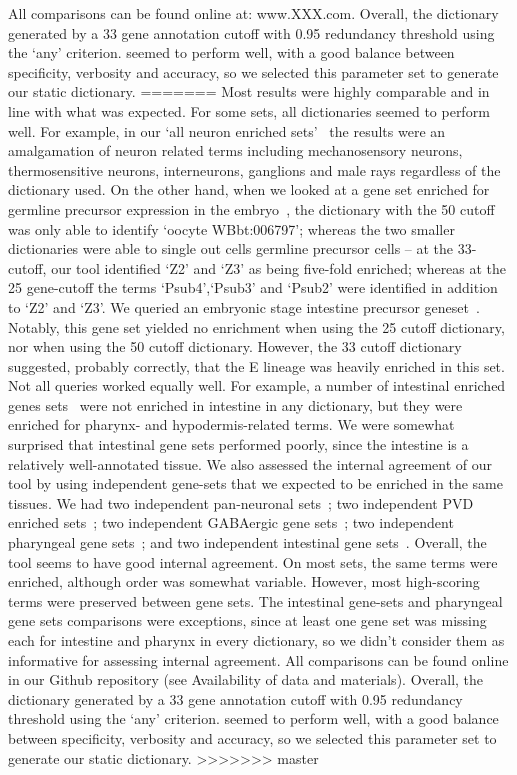 \documentclass[linenumbers, doublespacing]{bmcart}
\begin{document}
	
	 All comparisons can be found online at: www.XXX.com. Overall, the dictionary generated by a 33 gene annotation cutoff with 0.95 redundancy threshold using the `any' criterion. seemed to perform well, with a good balance between specificity, verbosity and accuracy, so we selected this parameter set to generate our static dictionary. 
=======
	Most results were highly comparable and in line with what was expected. For some sets, all dictionaries seemed to perform well. For example, in our `all neuron enriched sets'~\cite{Spencer2011, Watson2008a} the results were an amalgamation of neuron related terms including mechanosensory neurons, thermosensitive neurons, interneurons, ganglions and male rays regardless of the dictionary used. On the other hand, when we looked at a gene set enriched for germline precursor expression in the embryo~\cite{Spencer2011}, the dictionary with the 50 cutoff was only able to identify `oocyte WBbt:006797'; whereas the two smaller dictionaries were able to single out cells germline precursor cells -- at the 33-cutoff, our tool identified `Z2' and `Z3' as being five-fold enriched; whereas at the 25 gene-cutoff the terms `Psub4',`Psub3' and `Psub2' were identified in addition to `Z2' and `Z3'.
	We queried an embryonic stage intestine precursor geneset~\cite{Spencer2011}. Notably, this gene set yielded no enrichment when using the 25 cutoff dictionary, nor when using the 50 cutoff dictionary. However, the 33 cutoff dictionary suggested, probably correctly, that the E lineage was heavily enriched in this set. 
	Not all queries worked equally well. For example, a number of intestinal enriched genes sets~\cite{Spencer2011, Pauli2006} were not enriched in intestine in any dictionary, but they were enriched for pharynx- and hypodermis-related terms. We were somewhat surprised that intestinal gene sets performed poorly, since the intestine is a relatively well-annotated tissue.
	We also assessed the internal agreement of our tool by using independent gene-sets that we expected to be enriched in the same tissues. We had two independent pan-neuronal sets~\cite{Spencer2011, Watson2008a}; two independent PVD enriched sets~\cite{Spencer2011, Smith2010}; two independent GABAergic gene sets~\cite{Spencer2011, Cinar2005}; two independent pharyngeal gene sets~\cite{Spencer2011, Gaudet2004}; and two independent intestinal gene sets~\cite{Spencer2011, Pauli2006}. Overall, the tool seems to have good internal agreement. On most sets, the same terms were enriched, although order was somewhat variable. However, most high-scoring terms were preserved between gene sets. The intestinal gene-sets and pharyngeal gene sets comparisons were exceptions, since at least one gene set was missing each for intestine and pharynx in every dictionary, so we didn't consider them as informative for assessing internal agreement. 
	 All comparisons can be found online in our Github repository (see Availability of data and materials). Overall, the dictionary generated by a 33 gene annotation cutoff with 0.95 redundancy threshold using the `any' criterion. seemed to perform well, with a good balance between specificity, verbosity and accuracy, so we selected this parameter set to generate our static dictionary. 
>>>>>>> master
	
\end{document}
